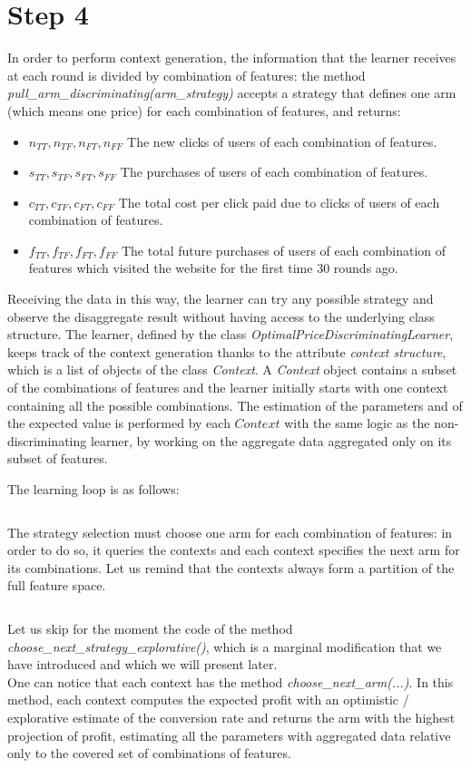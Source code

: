 \documentclass[11pt]{article} %
\begin{document}
\section{Step 4}
In order to perform context generation, the information that the learner receives at each round is divided by combination of features: the method \textit{pull\_arm\_discriminating(arm\_strategy)} accepts a strategy that defines one arm (which means one price) for each combination of features, and returns:
\begin{itemize}
\item $n_{TT},n_{TF},n_{FT},n_{FF}$ The new clicks of users of each combination of features.
\item $s_{TT}, s_{TF},s_{FT},s_{FF}$ The purchases of users of each combination of features.
\item $c_{TT},c_{TF},c_{FT},c_{FF}$ The total cost per click paid due to clicks of users of each combination of features.
\item $f_{TT},f_{TF},f_{FT},f_{FF}$ The total future purchases of users of each combination of features which visited the website for the first time $30$ rounds ago.
\end{itemize}
Receiving the data in this way, the learner can try any possible strategy and observe the disaggregate result without having access to the underlying class structure.
The learner, defined by the class \textit{OptimalPriceDiscriminatingLearner}, keeps track of the context generation thanks to the attribute \textit{context structure}, which is a list of objects of the class \textit{Context}. A \textit{Context} object contains a subset of the combinations of features and the learner initially starts with one context containing all the possible combinations. The estimation of the parameters and of the expected value is performed by each $Context$ with the same logic as the non-discriminating learner, by working on the aggregate data aggregated only on its subset of features.

The learning loop is as follows:
\inputminted{python}{code/step4_learning_loop.py}

\begin{samepage}
The strategy selection must choose one arm for each combination of features: in order to do so, it queries the contexts and each context specifies the next arm for its combinations. Let us remind that the contexts always form a partition of the full feature space.
\inputminted{python}{code/step4_choose_next_strategy.py}
\end{samepage}
Let us skip for the moment the code of the method \textit{choose\_next\_strategy\_explorative()}, which is a marginal modification that we have introduced and which we will present later.\\
One can notice that each context has the method \textit{choose\_next\_arm(...)}. In this method, each context computes the expected profit with an optimistic / explorative estimate of the conversion rate and returns the arm with the highest projection of profit, estimating all the parameters with aggregated data relative only to the covered set of combinations of features.
\end{document}
